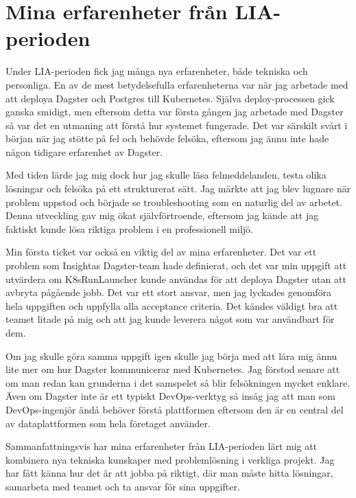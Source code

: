 \section{Mina erfarenheter från LIA-perioden}
\label{sec:erfarenheter}

Under LIA-perioden fick jag många nya erfarenheter, både tekniska och personliga. En av de mest betydelsefulla erfarenheterna var när jag arbetade med att deploya Dagster och Postgres till Kubernetes. Själva deploy-processen gick ganska smidigt, men eftersom detta var första gången jag arbetade med Dagster så var det en utmaning att förstå hur systemet fungerade. Det var särskilt svårt i början när jag stötte på fel och behövde felsöka, eftersom jag ännu inte hade någon tidigare erfarenhet av Dagster.

Med tiden lärde jag mig dock hur jag skulle läsa felmeddelanden, testa olika lösningar och felsöka på ett strukturerat sätt. Jag märkte att jag blev lugnare när problem uppstod och började se troubleshooting som en naturlig del av arbetet. Denna utveckling gav mig ökat självförtroende, eftersom jag kände att jag faktiskt kunde lösa riktiga problem i en professionell miljö.

Min första ticket var också en viktig del av mina erfarenheter. Det var ett problem som Insightas Dagster-team hade definierat, och det var min uppgift att utvärdera om K8sRunLauncher kunde användas för att deploya Dagster utan att avbryta pågående jobb. Det var ett stort ansvar, men jag lyckades genomföra hela uppgiften och uppfylla alla acceptance criteria. Det kändes väldigt bra att teamet litade på mig och att jag kunde leverera något som var användbart för dem.

Om jag skulle göra samma uppgift igen skulle jag börja med att lära mig ännu lite mer om hur Dagster kommunicerar med Kubernetes. Jag förstod senare att om man redan kan grunderna i det samspelet så blir felsökningen mycket enklare. Även om Dagster inte är ett typiskt DevOps-verktyg så insåg jag att man som DevOps-ingenjör ändå behöver förstå plattformen eftersom den är en central del av dataplattformen som hela företaget använder.

Sammanfattningsvis har mina erfarenheter från LIA-perioden lärt mig att kombinera nya tekniska kunskaper med problemlösning i verkliga projekt. Jag har fått känna hur det är att jobba på riktigt, där man måste hitta lösningar, samarbeta med teamet och ta ansvar för sina uppgifter.